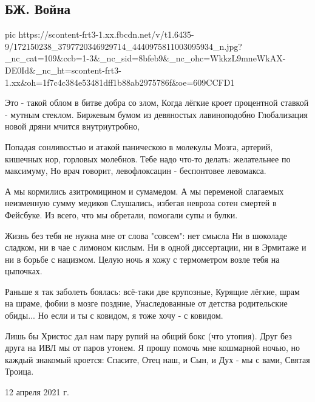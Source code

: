  
 
 
 
 

\subsection{БЖ. Война}
\label{sec:12_04_2021.fb.bilchenko_evgenia.1.vojna_dobro_zlo}

\ifcmt
  pic https://scontent-frt3-1.xx.fbcdn.net/v/t1.6435-9/172150238_3797720346929714_4440975811003095934_n.jpg?_nc_cat=109&ccb=1-3&_nc_sid=8bfeb9&_nc_ohc=WkkzL9mneWkAX-DE0Id&_nc_ht=scontent-frt3-1.xx&oh=1f7c4c384e53481dff1b88ab2975786f&oe=609CCFD1
\fi

Это - такой облом в битве добра со злом,
Когда лёгкие кроет процентной ставкой - мутным стеклом.
Биржевым бумом из девяностых лавиноподобно
Глобализация новой дряни мчится внутриутробно,

Попадая сонливостью и атакой паническою в молекулы
Мозга, артерий, кишечных нор, горловых молебнов.
Тебе надо что-то делать: желательнее по максимуму,
Но врач говорит, левофлоксацин - беспонтовее левомакса.

А мы кормились азитромицином и сумамедом.
А мы переменой слагаемых неизменную сумму медиков
Слушались, избегая невроза сотен смертей в Фейсбуке.
Из всего, что мы обретали, помогали супы и булки.

Жизнь без тебя не нужна мне от слова "совсем": нет смысла
Ни в шоколаде сладком, ни в чае с лимоном кислым.
Ни в одной диссертации, ни в Эрмитаже и ни в борьбе с нацизмом.
Целую ночь я хожу с термометром возле тебя на цыпочках.

Раньше я так заболеть боялась: всё-таки две крупозные,
Курящие лёгкие, шрам на шраме, фобии в мозге поздние,
Унаследованные от детства родительские обиды...
Но если и ты с ковидом, я тоже хочу - с ковидом.

Лишь бы Христос дал нам пару рупий на общий бокс (что утопия).
Друг без друга на ИВЛ мы от паров утонем.
Я прошу помочь мне кошмарной ночью, но каждый знакомый кроется:
Спасите, Отец наш, и Сын, и Дух - мы с вами, Святая Троица. 

12 апреля 2021 г.
